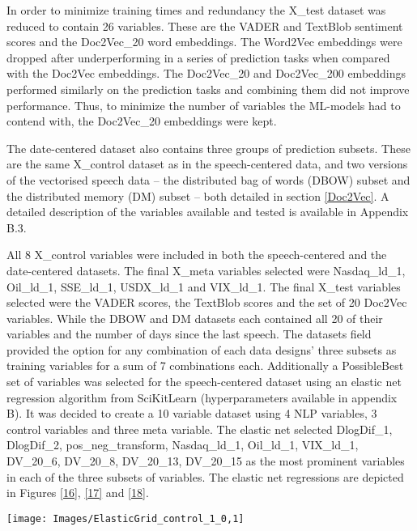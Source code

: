 \documentclass[11pt,preprint, authoryear]{elsarticle}
\let\origfigure\figure
\let\endorigfigure\endfigure
\renewenvironment{figure}[1][2] {
    \expandafter\origfigure\expandafter[H]
} {
    \endorigfigure
}
\numberwithin{equation}{section}
\numberwithin{figure}{section}
\numberwithin{table}{section}
\begin{document}
In order to minimize training times and redundancy the X\_test dataset
was reduced to contain 26 variables. These are the VADER and TextBlob
sentiment scores and the Doc2Vec\_20 word embeddings. The Word2Vec
embeddings were dropped after underperforming in a series of prediction
tasks when compared with the Doc2Vec embeddings. The Doc2Vec\_20 and
Doc2Vec\_200 embeddings performed similarly on the prediction tasks and
combining them did not improve performance. Thus, to minimize the number
of variables the ML-models had to contend with, the Doc2Vec\_20
embeddings were kept.

The date-centered dataset also contains three groups of prediction
subsets. These are the same X\_control dataset as in the speech-centered
data, and two versions of the vectorised speech data -- the distributed
bag of words (DBOW) subset and the distributed memory (DM) subset --
both detailed in section \ref{Doc2Vec}. A detailed description of the
variables available and tested is available in Appendix B.3.

All 8 X\_control variables were included in both the speech-centered and
the date-centered datasets. The final X\_meta variables selected were
Nasdaq\_ld\_1, Oil\_ld\_1, SSE\_ld\_1, USDX\_ld\_1 and VIX\_ld\_1. The
final X\_test variables selected were the VADER scores, the TextBlob
scores and the set of 20 Doc2Vec variables. While the DBOW and DM
datasets each contained all 20 of their variables and the number of days
since the last speech. The datasets field provided the option for any
combination of each data designs' three subsets as training variables
for a sum of 7 combinations each. Additionally a PossibleBest set of
variables was selected for the speech-centered dataset using an elastic
net regression algorithm from SciKitLearn (hyperparameters available in
appendix B). It was decided to create a 10 variable dataset using 4 NLP
variables, 3 control variables and three meta variable. The elastic net
selected DlogDif\_1, DlogDif\_2, pos\_neg\_transform, Nasdaq\_ld\_1,
Oil\_ld\_1, VIX\_ld\_1, DV\_20\_6, DV\_20\_8, DV\_20\_13, DV\_20\_15 as
the most prominent variables in each of the three subsets of variables.
The elastic net regressions are depicted in Figures \ref{16}, \ref{17}
and \ref{18}.

\begin{figure}[H]

{\centering \texttt{[image: Images/ElasticGrid\_control\_1\_0,1]} 

}

\caption{Elastic net: test set \label{Figure16}}\label{fig:Elastic net: test set}
\end{figure}
\end{document}

